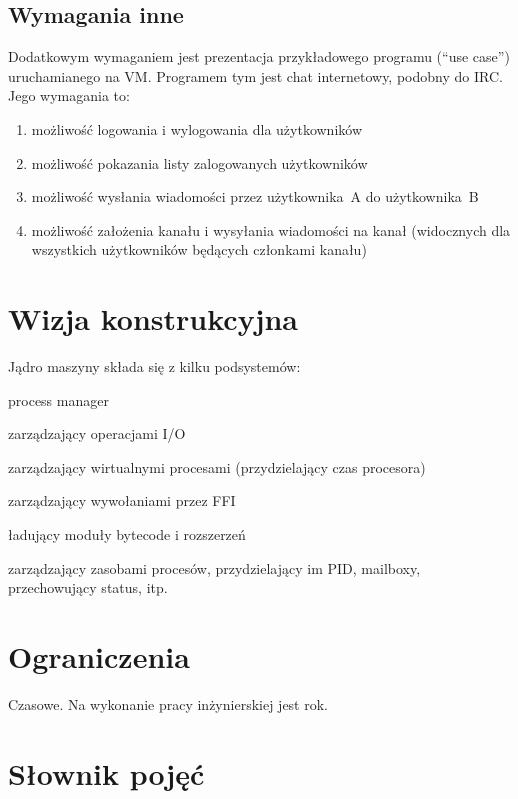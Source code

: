 \documentclass[11pt,oneside,a4paper,titlepage,onecolumn]{article}
\begin{document}
\subsection{Wymagania inne}

Dodatkowym wymaganiem jest prezentacja przykładowego programu (``use case'') uruchamianego na VM.
Programem tym jest chat internetowy, podobny do IRC. Jego wymagania to:

\begin{enumerate}
    \item możliwość logowania i wylogowania dla użytkowników
    \item możliwość pokazania listy zalogowanych użytkowników
    \item możliwość wysłania wiadomości przez użytkownika~A do użytkownika~B
    \item możliwość założenia kanału i wysyłania wiadomości na kanał (widocznych dla wszystkich użytkowników
        będących członkami kanału)
\end{enumerate}

\section{Wizja konstrukcyjna}

Jądro maszyny składa się z kilku podsystemów:

\begin{labeling}{process manager}
\item [scheduler IO] zarządzający operacjami I/O
\item [scheduler VP] zarządzający wirtualnymi procesami (przydzielający czas procesora)
\item [scheduler FFI] zarządzający wywołaniami przez FFI
\item [loader] ładujący moduły bytecode i rozszerzeń
\item [process manager] zarządzający zasobami procesów, przydzielający im PID, mailboxy, przechowujący status,
    itp.
\end{labeling}

\section{Ograniczenia}

Czasowe. Na wykonanie pracy inżynierskiej jest rok.

\section{Słownik pojęć}
\end{document}
